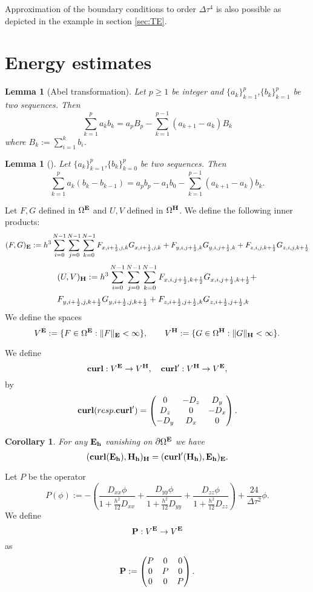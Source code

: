 \documentclass[12pt,reqno]{amsart}
\newcommand{\curl}{{\bf curl}}
\newtheorem{cor}[theorem]{Corollary}
\newtheorem{lem}[theorem]{Lemma}
\theoremstyle{definition}
\numberwithin{equation}{section}
\def\Gw{\Omega}     \def\Gx{\Xi}         \def\Gy{\Psi}
\begin{document}
	Approximation of the boundary conditions to order $\Delta \tau ^4$ is also possible as depicted in the example in section \ref{sec:TE}.
	

	

	\section{Energy estimates}
	\begin{lem}[Abel transformation]
		Let $p\geq 1$ be integer and $\{a_k\}_{k=1}^{p}$,$\{b_k\}_{k=1}^{p}$ be two sequences. Then
		$$
		\sum_{k=1}^{p}a_kb_k=a_pB_p-\sum_{k=1}^{p-1}(a_{k+1}-a_k)B_k
		$$
		where 
		$B_k:=\sum_{i=1}^{k}b_i$.
	\end{lem}
\begin{lem}[\cite{Morton}]
Let $\{a_k\}_{k=1}^{p}$,$\{b_k\}_{k=0}^{p}$ be two sequences. Then
$$
\sum_{k=1}^{p}a_k(b_k-b_{k-1})=a_pb_p-a_1b_0-\sum_{k=1}^{p-1}(a_{k+1}-a_k)b_k.
$$
\end{lem}


Let $F,G$ defined in $\Gw^{\bf{E}}$ and $U,V$ defined in 
$\Gw^{\bf{H}}$.
We define the following inner products:
$$
(F,G)_{\bf{E}}:=
h^3\sum_{i=0}^{N-1}\sum_{j=0}^{N-1}\sum_{k=0}^{N-1}
F_{x,i+\frac{1}{2},j,k}G_{x,i+\frac{1}{2},j,k}+
F_{y,i,j+\frac{1}{2},k}G_{y,i,j+\frac{1}{2},k}+F_{z,i,j,k+\frac{1}{2}}G_{z,i,j,k+\frac{1}{2}}
$$
\begin{align*}
	&
	(U,V)_{\bf{H}}:=
	h^3\sum_{i=0}^{N-1}\sum_{j=0}^{N-1}\sum_{k=0}^{N-1}
	F_{x,i,j+\frac{1}{2},k+\frac{1}{2}}G_{x,i,j+\frac{1}{2},k+\frac{1}{2}}+\\&
	F_{y,i+\frac{1}{2},j,k+\frac{1}{2}}G_{y,i+\frac{1}{2},j,k+\frac{1}{2}}+F_{z,i+\frac{1}{2},j+\frac{1}{2},k}G_{z,i+\frac{1}{2},j+\frac{1}{2},k}
\end{align*}
We define the spaces 
$$
V^{\bf{E}}:=\{F \in \Gw^{\bf{E}}:\|F\|_{\bf{E}}<\infty\}, \qquad 
V^{\bf{H}}:=\{G \in \Gw^{\bf{H}}:\|G\|_{\bf{H}}<\infty\}.
$$

We define 
$$
\mathbf{\curl}:V^{\bf{E}}\to V^{\bf{H}}, \quad 
\mathbf{\curl'}:V^{\bf{H}}\to V^{\bf{E}},
$$
by
$$
\mathbf{\curl}( resp. \mathbf{\curl}')=
\begin{pmatrix}
	0& -D_z & D _y\\
	D_z&0&-D_x\\
	-D_y&D_x&0\\
\end{pmatrix}.
$$
\begin{cor}
	For any $\bf{E}_h$ vanishing on $\partial \Gw^{\bf{E}}$ we have 
	$$
	(\mathbf{\curl}(\bf{E}_h),\bf{H}_h)_{\bf{H}}=
		(\mathbf{\curl}'(\bf{H}_h),\bf{E}_h)_{\bf{E}}.
	$$
\end{cor}
Let $P$ be the operator
$$
	P(\phi):=
		-	\left (
	\frac{D_{xx}\phi}{1+\frac{h^2}{12}D_{xx}}+\frac{D_{yy}\phi}{1+\frac{h^2}{12}D_{yy}}
	+\frac{D_{zz}\phi}{1+\frac{h^2}{12}D_{zz}}\right)
	+\frac{24}{\Delta \tau^2}\phi.
	$$
	We define 
	$$
	{\bf P}:V^{\bf{E}}\to V^{\bf{E}}
	$$
	as $$\bf{P}:=
	\begin{pmatrix}
		P & 0&0 \\
		0&P& 0 \\
		0&0 &P
	\end{pmatrix}.
	$$
\end{document}
